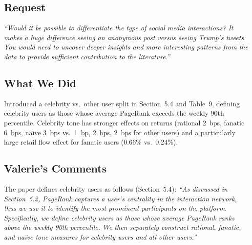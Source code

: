\documentclass[11pt]{article}
\begin{document}
\subsection*{Request}
\begin{mdframed}
\textit{``Would it be possible to differentiate the type of social media
interactions? It makes a huge difference seeing an anonymous post versus
seeing Trump's tweets. You would need to uncover deeper insights and more
interesting patterns from the data to provide sufficient contribution to
the literature.''}
\end{mdframed}

\subsection*{What We Did}
Introduced a celebrity vs.\ other user split in Section~5.4 and Table~9,
defining celebrity users as those whose average PageRank exceeds the weekly
90th percentile. Celebrity tone has stronger effects on returns (rational
2~bps, fanatic 6~bps, na\"{i}ve 3~bps vs.\ 1~bp, 2~bps, 2~bps for other
users) and a particularly large retail flow effect for fanatic users (0.66\%
vs.\ 0.24\%).

\subsection*{Valerie's Comments}
The paper defines celebrity users as follows (Section~5.4): \textit{``As discussed in
Section~5.2, PageRank captures a user's centrality in the interaction network,
thus we use it to identify the most prominent participants on the platform.
Specifically, we define celebrity users as those whose average PageRank ranks
above the weekly 90th percentile. We then separately construct rational,
fanatic, and na\"{i}ve tone measures for celebrity users and all other users.''}
\end{document}
